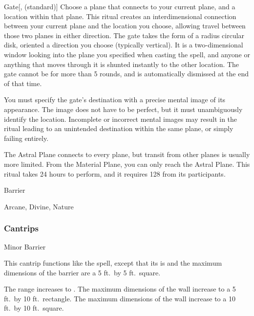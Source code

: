 \lowercase{\hypertarget{spell:Gate}{}}\label{spell:Gate}
\begin{freeability}[Rank 8]{\hypertarget{spell:Gate}{Gate}}[,  (standard)]
Choose a plane that connects to your current plane, and a location within that plane.
This ritual creates an interdimensional connection between your current plane and the location you choose, allowing travel between those two planes in either direction.
The gate takes the form of a \areasmall radius circular disk, oriented a direction you choose (typically vertical).
It is a two-dimensional window looking into the plane you specified when casting the spell, and anyone or anything that moves through it is shunted instantly to the other location.
The gate cannot be  for more than 5 rounds, and is automatically dismissed at the end of that time.

You must specify the gate's destination with a precise mental image of its appearance.
The image does not have to be perfect, but it must unambiguously identify the location.
Incomplete or incorrect mental images may result in the ritual leading to an unintended destination within the same plane, or simply failing entirely.

The Astral Plane connects to every plane, but transit from other planes is usually more limited.
From the Material Plane, you can only reach the Astral Plane.
This ritual takes 24 hours to perform, and it requires 128  from its participants.
\end{freeability}
\vspace{0.25em}


\newpage
\begin{spellsection}{Barrier}

\begin{spellheader}
\end{spellheader}


 Arcane, Divine, Nature

\subsubsection{Cantrips}


\begin{freeability}{Minor Barrier}

This cantrip functions like the  spell, except that its  is \rngclose and the maximum dimensions of the barrier are a 5 ft.\ by 5 ft.\ square.

\rankline
{} The range increases to \rngmed.
 The maximum dimensions of the wall increase to a 5 ft.\ by 10 ft.\ rectangle.
 The maximum dimensions of the wall increase to a 10 ft.\ by 10 ft.\ square.
\end{freeability}

\end{spellsection}


